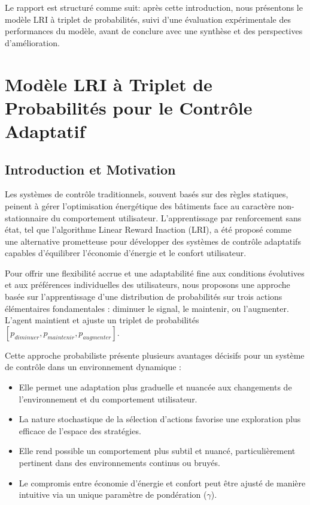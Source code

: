 \documentclass[a4paper,11pt]{article}
\begin{document}
Le rapport est structuré comme suit: après cette introduction, nous présentons le modèle LRI à triplet de probabilités, suivi d'une évaluation expérimentale des performances du modèle, avant de conclure avec une synthèse et des perspectives d'amélioration.

\section{Modèle LRI à Triplet de Probabilités pour le Contrôle Adaptatif}

\subsection{Introduction et Motivation}

Les systèmes de contrôle traditionnels, souvent basés sur des règles statiques, peinent à gérer l'optimisation énergétique des bâtiments face au caractère non-stationnaire du comportement utilisateur. L'apprentissage par renforcement sans état, tel que l'algorithme Linear Reward Inaction (LRI), a été proposé comme une alternative prometteuse pour développer des systèmes de contrôle adaptatifs capables d'équilibrer l'économie d'énergie et le confort utilisateur.

Pour offrir une flexibilité accrue et une adaptabilité fine aux conditions évolutives et aux préférences individuelles des utilisateurs, nous proposons une approche basée sur l'apprentissage d'une distribution de probabilités sur trois actions élémentaires fondamentales : diminuer le signal, le maintenir, ou l'augmenter. L'agent maintient et ajuste un triplet de probabilités $[p_{diminuer}, p_{maintenir}, p_{augmenter}]$.

Cette approche probabiliste présente plusieurs avantages décisifs pour un système de contrôle dans un environnement dynamique :
\begin{itemize}
\item Elle permet une adaptation plus graduelle et nuancée aux changements de l'environnement et du comportement utilisateur.
\item La nature stochastique de la sélection d'actions favorise une exploration plus efficace de l'espace des stratégies.
\item Elle rend possible un comportement plus subtil et nuancé, particulièrement pertinent dans des environnements continus ou bruyés.
\item Le compromis entre économie d'énergie et confort peut être ajusté de manière intuitive via un unique paramètre de pondération ($\gamma$).
\end{itemize}
\end{document}
